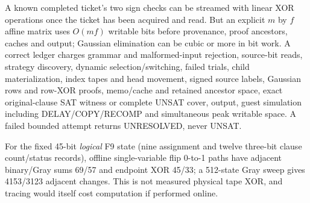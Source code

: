 \documentclass[11pt]{article}
\begin{document}
A known completed ticket's two sign checks can be streamed with linear XOR operations once the ticket has been acquired and read. But an explicit $m$ by $f$ affine matrix uses $O(mf)$ writable bits before provenance, proof ancestors, caches and output; Gaussian elimination can be cubic or more in bit work. A correct ledger charges grammar and malformed-input rejection, source-bit reads, strategy discovery, dynamic selection/switching, failed trials, child materialization, index tapes and head movement, signed source labels, Gaussian rows and row-XOR proofs, memo/cache and retained ancestor space, exact original-clause SAT witness or complete UNSAT cover, output, guest simulation including DELAY/COPY/RECOMP and simultaneous peak writable space. A failed bounded attempt returns UNRESOLVED, never UNSAT.

For the fixed 45-bit \emph{logical} F9 state (nine assignment and twelve three-bit clause count/status records), offline single-variable flip 0-to-1 paths have adjacent binary/Gray sums 69/57 and endpoint XOR 45/33; a 512-state Gray sweep gives 4153/3123 adjacent changes. This is not measured physical tape XOR, and tracing would itself cost computation if performed online.
\end{document}
